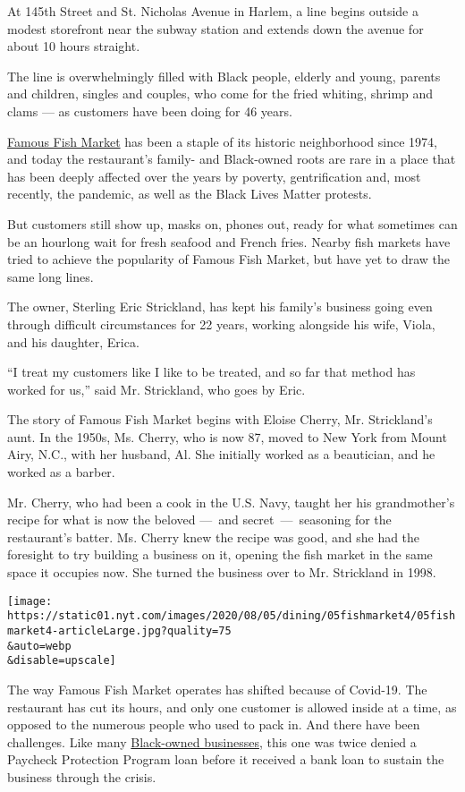 At 145th Street and St. Nicholas Avenue in Harlem, a line begins outside
a modest storefront near the subway station and extends down the avenue
for about 10 hours straight.

The line is overwhelmingly filled with Black people, elderly and young,
parents and children, singles and couples, who come for the fried
whiting, shrimp and clams --- as customers have been doing for 46 years.

\href{http://www.famousfishmarket.us/}{Famous Fish Market} has been a
staple of its historic neighborhood since 1974, and today the
restaurant's family- and Black-owned roots are rare in a place that has
been deeply affected over the years by poverty, gentrification and, most
recently, the pandemic, as well as the Black Lives Matter protests.

But customers still show up, masks on, phones out, ready for what
sometimes can be an hourlong wait for fresh seafood and French fries.
Nearby fish markets have tried to achieve the popularity of Famous Fish
Market, but have yet to draw the same long lines.

The owner, Sterling Eric Strickland, has kept his family's business
going even through difficult circumstances for 22 years, working
alongside his wife, Viola, and his daughter, Erica.

``I treat my customers like I like to be treated, and so far that method
has worked for us,'' said Mr. Strickland, who goes by Eric.

The story of Famous Fish Market begins with Eloise Cherry, Mr.
Strickland's aunt. In the 1950s, Ms. Cherry, who is now 87, moved to New
York from Mount Airy, N.C., with her husband, Al. She initially worked
as a beautician, and he worked as a barber.

Mr. Cherry, who had been a cook in the U.S. Navy, taught her his
grandmother's recipe for what is now the beloved ---~and
secret~---~seasoning for the restaurant's batter. Ms. Cherry knew the
recipe was good, and she had the foresight to try building a business on
it, opening the fish market in the same space it occupies now. She
turned the business over to Mr. Strickland in 1998.

\texttt{[image: https://static01.nyt.com/images/2020/08/05/dining/05fishmarket4/05fishmarket4-articleLarge.jpg?quality=75\\\&auto=webp\\\&disable=upscale]}

The way Famous Fish Market operates has shifted because of Covid-19. The
restaurant has cut its hours, and only one customer is allowed inside at
a time, as opposed to the numerous people who used to pack in. And there
have been challenges. Like many
\href{https://www.nytimes.com/2020/05/18/business/minority-businesses-coronavirus-loans.html}{Black-owned
businesses}, this one was twice denied a Paycheck Protection Program
loan before it received a bank loan to sustain the business through the
crisis.


